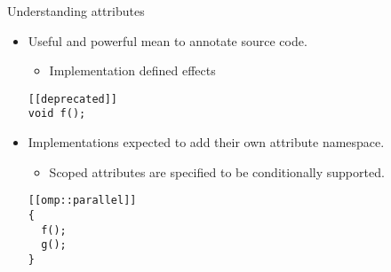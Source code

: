 \begin{frame}[t,fragile]{Understanding attributes}
\begin{itemize}
  \item Useful and powerful mean to annotate source code.
    \begin{itemize}
      \item Implementation defined effects
    \end{itemize}
\begin{lstlisting}
[[deprecated]]
void f();
\end{lstlisting}

  \vfill\pause
  \item Implementations expected to add their own attribute namespace.
    \begin{itemize}
      \item Scoped attributes are specified to be conditionally supported.
    \end{itemize}
\begin{lstlisting}
[[omp::parallel]]
{
  f();
  g();
}
\end{lstlisting}
\end{itemize}
\end{frame}
